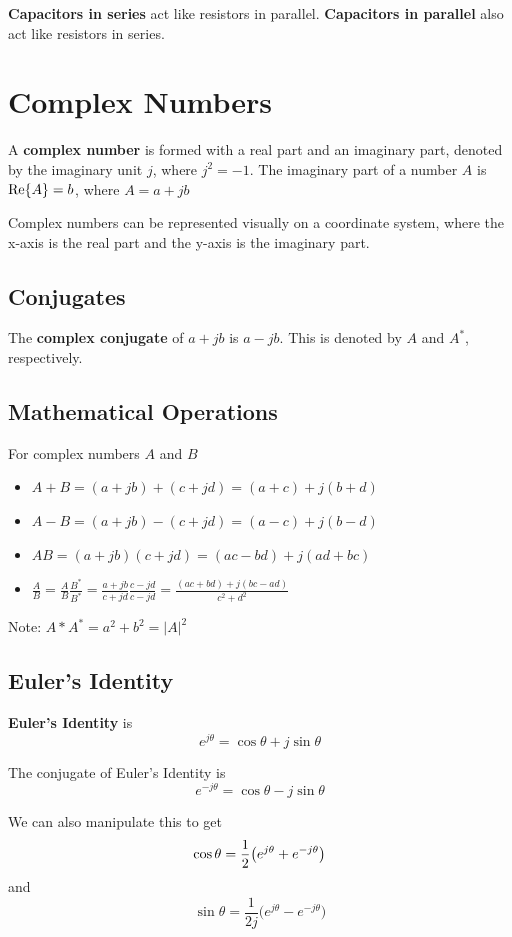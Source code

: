 \documentclass[12pt]{article}
\begin{document}
{\bf Capacitors in series} act like resistors in parallel. {\bf Capacitors in parallel} also act like resistors in series.

\section*{Complex Numbers}
A {\bf complex number} is formed with a real part and an imaginary part, denoted by the imaginary unit $j$, where $j^2 = -1$. The imaginary part of a number $A$ is ${\rm Re}\{A\} = b$, where $A = a + jb$

Complex numbers can be represented visually on a coordinate system, where the x-axis is the real part and the y-axis is the imaginary part.

\subsection*{Conjugates}
The {\bf complex conjugate} of $a + jb$ is $a - jb$. This is denoted by $A$ and $A^*$, respectively.

\subsection*{Mathematical Operations}
For complex numbers $A$ and $B$
\begin{itemize}
\item $A + B = (a + jb) + (c + jd) = (a + c) + j(b + d)$
\item $A - B = (a + jb) - (c + jd) = (a - c) + j(b - d)$
\item $AB = (a + jb)(c + jd) = (ac - bd) + j(ad + bc)$
\item $\frac{A}{B} = \frac{A}{B}\frac{B^*}{B^*} = \frac{a + jb}{c + jd}\frac{c - jd}{c - jd} = \frac{(ac + bd) + j(bc - ad)}{c^2 + d^2}$
\end{itemize}

Note: $A * A^* = a^2 + b^2 = {|A|}^2$

\subsection*{Euler's Identity}
{\bf Euler's Identity} is \[ e^{j\theta} = \cos\theta + j\sin\theta \]

The conjugate of Euler's Identity is \[ e^{-j\theta} = \cos\theta - j\sin\theta \]

We can also manipulate this to get \[ \cos\theta = \frac{1}{2} \bigl(e^{j\theta} + e^{-j\theta}\bigl) \] and \[ \sin\theta = \frac{1}{2j}\bigl(e^{j\theta} - e^{-j\theta}\bigl) \]
\end{document}
